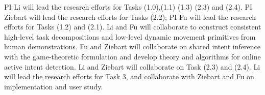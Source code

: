 \vspace{2ex}

\noindent
PI Li will lead the research efforts for Tasks (1.0),(1.1) (1.3) (2.3) and (2.4). PI Ziebart will lead the research efforts for Tasks (2.2); PI  Fu will lead the research efforts for Tasks (1.2) and (2.1). Li and Fu will collaborate to construct consistent high-level task decompositions and low-level dynamic movement primitives from human demonstrations. Fu and Ziebart will collaborate on shared intent inference with the game-theoretic formulation and develop theory and algorithms for online active intent detection. Li and Ziebart will collaborate on Task (2.3) and (2.4). Li will lead the research efforts for Task 3, and collaborate with Ziebart and Fu on implementation and user study.
